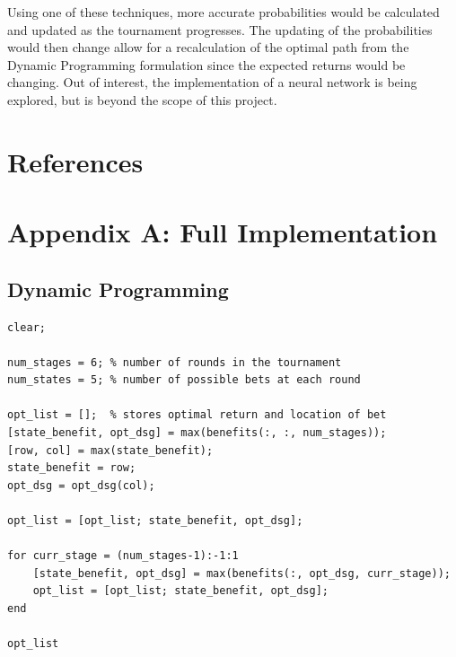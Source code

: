 \documentclass[12pt]{article}
\begin{document}
Using one of these techniques, more accurate probabilities would be calculated and updated as the tournament progresses.
The updating of the probabilities would then change allow for a recalculation of the optimal path from the Dynamic Programming formulation since the expected returns would be changing.
Out of interest, the implementation of a neural network is being explored, but is beyond the scope of this project.

\newpage
\section{References}



\newpage
\section{Appendix A: Full Implementation}
\subsection{Dynamic Programming}
\begin{verbatim}
clear;

num_stages = 6;	% number of rounds in the tournament
num_states = 5;	% number of possible bets at each round

opt_list = [];	% stores optimal return and location of bet
[state_benefit, opt_dsg] = max(benefits(:, :, num_stages));
[row, col] = max(state_benefit);
state_benefit = row;
opt_dsg = opt_dsg(col);

opt_list = [opt_list; state_benefit, opt_dsg];

for curr_stage = (num_stages-1):-1:1
	[state_benefit, opt_dsg] = max(benefits(:, opt_dsg, curr_stage));
	opt_list = [opt_list; state_benefit, opt_dsg];
end

opt_list
\end{verbatim}

\begingroup
    \fontsize{8pt}{10pt}
    \lstset{breaklines=true}
	
\end{document}
